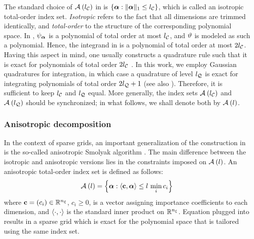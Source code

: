 The standard choice of $\multiindexSet{\nclevel}$ in  is $\{ \multiindex: \norm[1]{\multiindex} \leq \nclevel \}$, which is called an isotropic total-order index set.
\emph{Isotropic} refers to the fact that all dimensions are trimmed identically, and \emph{total-order} to the structure of the corresponding polynomial space.
In , $\polynomial_{\multiindex}$ is a polynomial of total order at most $\nclevel$, and $\w$ is modeled as such a polynomial.
Hence, the integrand in  is a polynomial of total order at most $2 \nclevel$.
Having this aspect in mind, one usually constructs a quadrature rule such that it is exact for polynomials of total order $2 \nclevel$ \cite{eldred2008}.
In this work, we employ Gaussian quadratures for integration, in which case a quadrature of level $\nqlevel$ is exact for integrating polynomials of total order $2 \nqlevel + 1$ \cite{heiss2008} (see also ).
Therefore, it is sufficient to keep $\nclevel$ and $\nqlevel$ equal.
More generally, the index sets $\multiindexSet{\nclevel}$ and $\multiindexSet{\nqlevel}$ should be synchronized; in what follows, we shall denote both by $\multiindexSet{\level}$.

\subsubsection{Anisotropic decomposition}
In the context of sparse grids, an important generalization of the construction in  is the so-called anisotropic Smolyak algorithm \cite{nobile2008}.
The main difference between the isotropic and anisotropic versions lies in the constraints imposed on $\quadratureMultiindexSet{\level}$.
An anisotropic total-order index set is defined as follows:
\begin{equation} \elab{anisotropic-total-order-index-set}
  \chaosMultiindexSet{\level} = \left\{ \multiindex: \innerProduct{\dimensionAnisotropy, \multiindex} \leq \level \, \min_i c_i \right\}
\end{equation}
where $\dimensionAnisotropy = (c_i) \in \real^\nvars$, $c_i \geq 0$, is a vector assigning importance coefficients to each dimension, and $\innerProduct{\cdot, \cdot}$ is the standard inner product on $\real^\nvars$.
Equation  plugged into  results in a sparse grid which is exact for the polynomial space that is tailored using the same index set.

